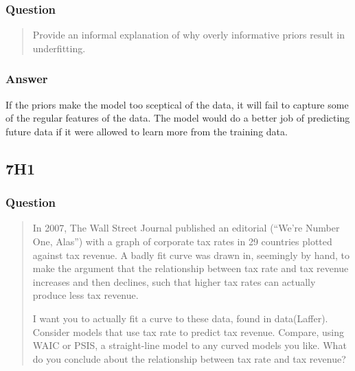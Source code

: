 \documentclass[
]{book}
\begin{document}
\hypertarget{question-69}{%
\subsubsection*{Question}\label{question-69}}

\begin{quote}
Provide an informal explanation of why overly informative priors result in underfitting.
\end{quote}

\hypertarget{answer-69}{%
\subsubsection*{Answer}\label{answer-69}}

If the priors make the model too sceptical of the data, it will fail to capture some of the regular features of the data. The model would do a better job of predicting future data if it were allowed to learn more from the training data.

\hypertarget{h1-3}{%
\subsection*{7H1}\label{h1-3}}

\hypertarget{question-70}{%
\subsubsection*{Question}\label{question-70}}

\begin{quote}
In 2007, The Wall Street Journal published an editorial (``We're Number One, Alas'') with a graph of corporate tax rates in 29 countries plotted against tax revenue. A badly fit curve was drawn in, seemingly by hand, to make the argument that the relationship between tax rate and tax revenue increases and then declines, such that higher tax rates can actually produce less tax revenue.

I want you to actually fit a curve to these data, found in data(Laffer). Consider models that use tax rate to predict tax revenue. Compare, using WAIC or PSIS, a straight-line model to any curved models you like. What do you conclude about the relationship between tax rate and tax revenue?
\end{quote}
\end{document}
